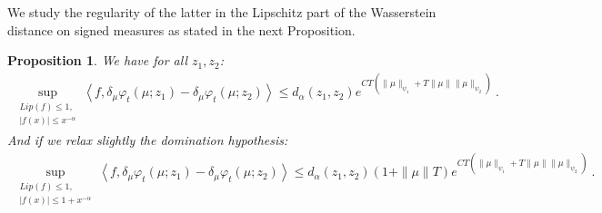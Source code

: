 \documentclass[11pt,a4paper]{article}
\newcommand{\RRP}{\mathbb{R}^+_*}
\newcommand{\red}[1]{\textcolor{red}{#1}}
\newcommand{\Proc}[1]{\left(#1\right)_{t\geq 0}}
\newcommand{\brac}[1]{\left\langle#1\right\rangle}
\newcommand{\dd}{\mathop{}\!\mathrm{d}}
\newtheorem{proposition}[theorem]{Proposition}
\begin{document}
We study the regularity of the latter in the Lipschitz part of the Wasserstein distance on signed measures as stated in the next Proposition.
\begin{proposition}\label{prop:wass-derivaitve}
    We have for all $z_1, z_2$:
    \begin{align*}
        \sup\limits_{\substack{Lip(f) \leq 1, \\|f(x)| \leq x^{-\alpha}}} \brac{f,\delta_\mu\varphi_t(\mu;z_1) - \delta_\mu\varphi_t(\mu;z_2)} \leq d_\alpha(z_1,z_2) e^{CT(\|\mu\|_{\psi_1} +  T\|\mu\|\|\mu\|_{\psi_2})}\ .
    \end{align*}
    And if we relax slightly the domination hypothesis:
    \begin{align*}
        \sup\limits_{\substack{Lip(f) \leq 1, \\|f(x)| \leq 1 +x^{-\alpha}}} \brac{f,\delta_\mu\varphi_t(\mu;z_1) - \delta_\mu\varphi_t(\mu;z_2)} \leq d_\alpha(z_1,z_2) (1 + \|\mu\|T)e^{CT(\|\mu\|_{\psi_1} +  T\|\mu\|\|\mu\|_{\psi_2})}\ .
    \end{align*}
\end{proposition}
\end{document}
